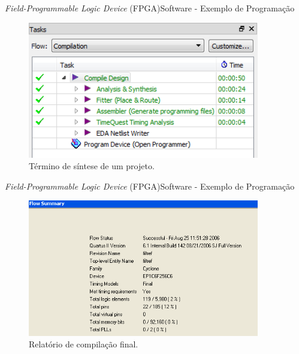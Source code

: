    	\begin{frame}{\textit{Field-Programmable Logic Device} (FPGA)}{Software - Exemplo de Programação}
    		\begin{figure}[p]
    			\centering
    			\includegraphics[width=0.9\textwidth]{img/fpga/software_quartus_compilation1.png}
    			\caption{Término de síntese de um projeto.}
    			\label{fig:alteraquartus_comp1}
    		\end{figure}
    	\end{frame}
    
    	\begin{frame}{\textit{Field-Programmable Logic Device} (FPGA)}{Software - Exemplo de Programação}
    		\begin{figure}[p]
    			\centering
    			\includegraphics[width=0.9\textwidth]{img/fpga/software_quartus_compilation2.png}
    			\caption{Relatório de compilação final.}
    			\label{fig:alteraquartus_comp2}
    		\end{figure}
    	\end{frame}
    
